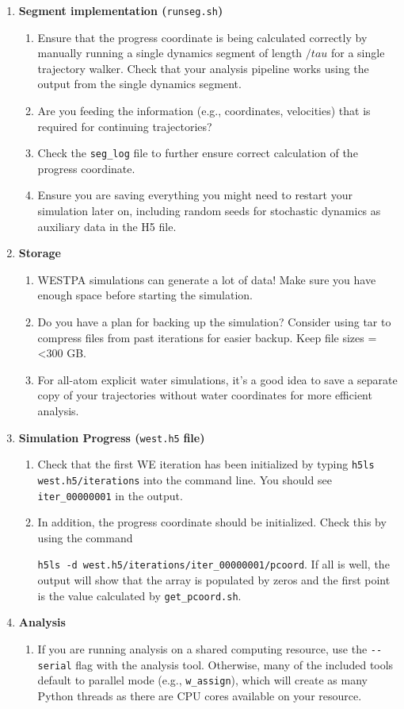 \documentclass[9pt,tutorial,ASAPversion]{livecoms}
\begin{document}
\begin{enumerate}
\begin{enumerate}
\end{enumerate}
\item \textbf{Segment implementation (}\verb|runseg.sh|\textbf{)}
\begin{enumerate}
\item Ensure that the progress coordinate is being calculated correctly by manually running a single dynamics segment of length $/tau$ for a single trajectory walker. 
Check that your analysis pipeline works using the output from the single dynamics segment. 
\item Are you feeding the information (e.g., coordinates, velocities) that is required for continuing trajectories? 
\item Check the \verb|seg_log| file to further ensure correct calculation of the progress coordinate. 
\item Ensure you are saving everything you might need to restart your simulation later on, including random seeds for stochastic dynamics as auxiliary data in the H5 file. 
\end{enumerate}
\item \textbf{Storage}
\begin{enumerate}
\item WESTPA simulations can generate a lot of data! Make sure you have enough space before starting the simulation.
\item Do you have a plan for backing up the simulation? 
Consider using tar to compress files from past iterations for easier backup. 
Keep file sizes =<300 GB. 
\item For all-atom explicit water simulations, it's a good idea to save a separate copy of your trajectories without water coordinates for more efficient analysis.
\end{enumerate}
\item \textbf{Simulation Progress (}\verb|west.h5| \textbf{file)}
\begin{enumerate}
\item Check that the first WE iteration has been initialized by typing \verb|h5ls west.h5/iterations| into the command line.  
You should see \verb|iter_00000001| in the output.
\item In addition, the progress coordinate should be initialized.
Check this by using the command 

\verb|h5ls -d west.h5/iterations/iter_00000001/pcoord|.
If all is well, the output will show that the array is populated by zeros and the first point is the value calculated by \verb|get_pcoord.sh|.
\end{enumerate}
\item \textbf{Analysis}
\begin{enumerate}
\item If you are running analysis on a shared computing resource, use the \verb|--serial| flag with the analysis tool. 
Otherwise, many of the included tools default to parallel mode (e.g., \verb|w_assign|), which will create as many Python threads as there are CPU cores available on your resource.
\end{enumerate}
\end{enumerate}
\end{document}
